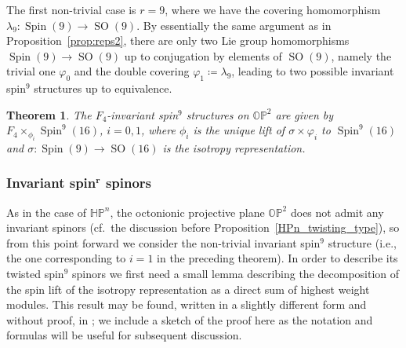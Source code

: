 \documentclass[pdftex]{sigma}
\numberwithin{equation}{section}
\newtheorem{Theorem}{Theorem}[section]
\DeclareMathOperator{\SO}{SO}
\DeclareMathOperator{\Spin}{Spin}
\begin{document}
		The first non-trivial case is $r=9$, where we have the covering homomorphism $\lambda_9 \colon \Spin(9) \to \SO(9)$. By essentially the same argument as in Proposition~\ref{prop:reps2}, there are only two Lie group homomorphisms $\Spin(9) \to \SO(9)$ up to conjugation by elements of $\SO(9)$, namely the trivial one $\varphi_0$ and the double covering $\varphi_1 \coloneqq \lambda_9$, leading to two possible invariant spin$^9$ structures up to equivalence.
		
		\begin{Theorem}\label{F4_inv_gen_spin}
			The $F_4$-invariant spin$^{9}$ structures on $\mathbb{OP}^{2}$ are given by
		$
				F_4 \times_{\phi_i} \Spin^{9}(16)$, ${i = 0,1}$,
			where $\phi_i$ is the unique lift of $\sigma \times \varphi_i$ to $\Spin^{9}(16)$ and $\sigma \colon \Spin(9) \to \SO(16)$ is the isotropy representation.
		\end{Theorem}
		
		\subsubsection[Invariant spin\^{}r spinors]{Invariant spin$^{\boldsymbol{r}}$ spinors}
		
		As in the case of $\mathbb{HP}^n$, the octonionic projective plane $\mathbb{OP}^2$ does not admit any invariant spinors (cf.\ the discussion before Proposition~\ref{HPn_twisting_type}), so from this point forward we consider the non-trivial invariant spin$^9$ structure (i.e., the one corresponding to $i=1$ in the preceding theorem). In order to describe its twisted spin$^9$ spinors we first need a small lemma describing the decomposition of the spin lift of the isotropy representation as a direct sum of highest weight modules. This result may be found, written in a slightly different form and without proof, in \cite[Section~7]{Fri01_weak_spin9}; we include a sketch of the proof here as the notation and formulas will be useful for subsequent discussion.
\end{document}
